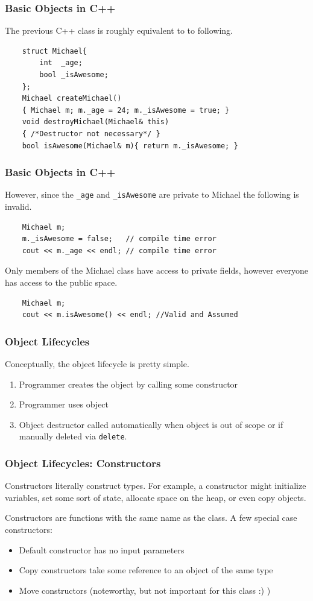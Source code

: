 \documentclass{beamer}
\begin{document}
\begin{frame}[fragile]
    \frametitle{Basic Objects in C++}
    The previous C++ class is roughly equivalent to to following.
    \begin{verbatim}
    struct Michael{
        int  _age;
        bool _isAwesome; 
    };
    Michael createMichael() 
    { Michael m; m._age = 24; m._isAwesome = true; }
    void destroyMichael(Michael& this) 
    { /*Destructor not necessary*/ }
    bool isAwesome(Michael& m){ return m._isAwesome; }
    \end{verbatim}
\end{frame}

\begin{frame}[fragile]
    \frametitle{Basic Objects in C++}

    However, since the \texttt{\_age} and \texttt{\_isAwesome} are private to Michael the following is invalid.

    \begin{verbatim}
    Michael m;
    m._isAwesome = false;   // compile time error
    cout << m._age << endl; // compile time error
    \end{verbatim}

    Only members of the Michael class have access to private fields, however everyone has access to the public space.
    \begin{verbatim}
    Michael m;
    cout << m.isAwesome() << endl; //Valid and Assumed   
    \end{verbatim}
\end{frame}

\begin{frame}
    \frametitle{Object Lifecycles}
    Conceptually, the object lifecycle is pretty simple.
    \begin{enumerate}
        \item Programmer creates the object by calling some constructor
        \item Programmer uses object
        \item Object destructor called automatically when object is out of scope or if manually deleted via \texttt{delete}.
    \end{enumerate}
\end{frame}

\begin{frame}
    \frametitle{Object Lifecycles: Constructors}
    Constructors literally construct types. 
    For example, a constructor might initialize variables, set some sort of state, allocate space on the heap, or even copy objects.

    Constructors are functions with the same name as the class. A few special case constructors:
    \begin{itemize}
    \item Default constructor has no input parameters
    \item Copy constructors take some reference to an object of the same type
    \item Move constructors (noteworthy, but not important for this class :) )
    \end{itemize}


\end{frame}
\end{document}
